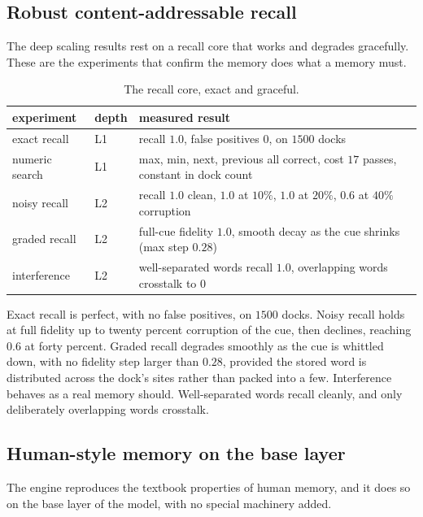 \subsection{Robust content-addressable recall}

The deep scaling results rest on a recall core that works and degrades gracefully. These are the experiments that confirm the memory does what a memory must.

\begin{table}[ht]
\centering
\begin{tabular}{@{}lll@{}}
\toprule
experiment & depth & measured result \\
\midrule
exact recall & L1 & recall $1.0$, false positives $0$, on $1500$ docks \\
numeric search & L1 & max, min, next, previous all correct, cost $17$ passes, constant in dock count \\
noisy recall & L2 & recall $1.0$ clean, $1.0$ at $10\%$, $1.0$ at $20\%$, $0.6$ at $40\%$ corruption \\
graded recall & L2 & full-cue fidelity $1.0$, smooth decay as the cue shrinks (max step $0.28$) \\
interference & L2 & well-separated words recall $1.0$, overlapping words crosstalk to $0$ \\
\bottomrule
\end{tabular}
\caption{The recall core, exact and graceful.}
\label{tab:recall}
\end{table}

Exact recall is perfect, with no false positives, on $1500$ docks. Noisy recall holds at full fidelity up to twenty percent corruption of the cue, then declines, reaching $0.6$ at forty percent. Graded recall degrades smoothly as the cue is whittled down, with no fidelity step larger than $0.28$, provided the stored word is distributed across the dock's sites rather than packed into a few. Interference behaves as a real memory should. Well-separated words recall cleanly, and only deliberately overlapping words crosstalk.

\subsection{Human-style memory on the base layer}

The engine reproduces the textbook properties of human memory, and it does so on the base layer of the model, with no special machinery added.

